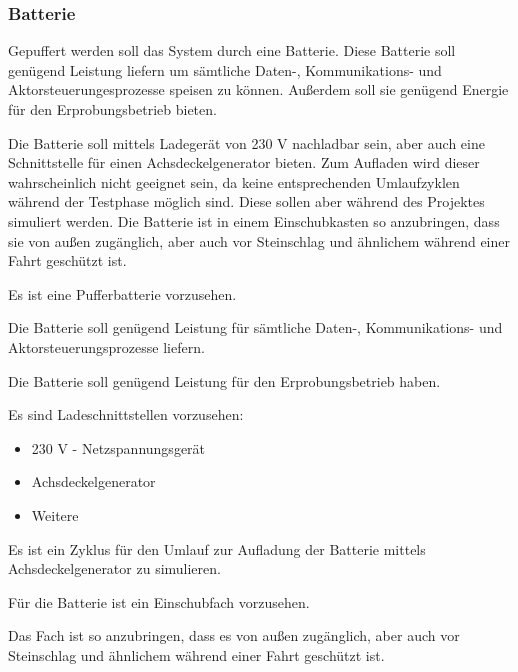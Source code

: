 \subsubsection{Batterie}
Gepuffert werden soll das System durch eine Batterie. Diese Batterie soll genügend Leistung liefern um sämtliche Daten-, Kommunikations- und Aktorsteuerungesprozesse speisen zu können. Außerdem soll sie genügend Energie für den Erprobungsbetrieb bieten.\par
Die Batterie soll mittels Ladegerät von 230 V nachladbar sein, aber auch eine Schnittstelle für einen Achsdeckelgenerator bieten. Zum Aufladen wird dieser wahrscheinlich nicht geeignet sein, da keine entsprechenden Umlaufzyklen während der Testphase möglich sind. Diese sollen aber während des Projektes simuliert werden. Die Batterie ist in einem Einschubkasten so anzubringen, dass sie von außen zugänglich, aber auch vor Steinschlag und ähnlichem während einer Fahrt geschützt ist.\par
\begin{feat}
Es ist eine Pufferbatterie vorzusehen.
\end{feat}
\begin{rem}
Die Batterie soll genügend Leistung für sämtliche Daten-, Kommunikations- und Aktorsteuerungsprozesse liefern.
\end{rem}
\begin{rem}
Die Batterie soll genügend Leistung für den Erprobungsbetrieb haben.
\end{rem}
\begin{rem}
Es sind Ladeschnittstellen vorzusehen:
\begin{itemize}
    \item 230 V - Netzspannungsgerät
    \item Achsdeckelgenerator
    \item Weitere
\end{itemize}
\end{rem}
\begin{feat}
Es ist ein Zyklus für den Umlauf zur Aufladung der Batterie mittels Achsdeckelgenerator zu simulieren.
\end{feat}
\begin{feat}
Für die Batterie ist ein Einschubfach vorzusehen. 
\end{feat}
\begin{rem}
Das Fach ist so anzubringen, dass es von außen zugänglich, aber auch vor Steinschlag und ähnlichem während einer Fahrt geschützt ist.
\end{rem}
